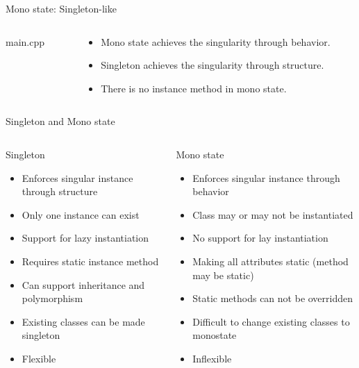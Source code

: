 \documentclass[13pt]{beamer}
\begin{document}
\begin{frame}{Mono state: Singleton-like}
\begin{columns}[T]
	\begin{column}{.45\textwidth}
		main.cpp
		\lstset{basicstyle=\tiny,style=myCustomCppStyle}
		
	\end{column}
	
	\begin{column}{.45\textwidth}
		\begin{itemize}
		\setlength\itemsep{1em}
		\item Mono state achieves the singularity through behavior.
		\item Singleton achieves the singularity through structure.
		\item There is no instance method in mono state.
\end{itemize}	
\end{column}
\end{columns}
\end{frame}

\begin{frame}{Singleton and Mono state}
\begin{columns}[T]
	\begin{column}{.45\textwidth}
		Singleton
		\begin{itemize}
			\item Enforces singular instance through structure
			\item Only one instance can exist
			\item Support for lazy instantiation
			\item Requires static instance method
			\item Can support inheritance and polymorphism
			\item Existing classes can be made singleton
			\item Flexible
		\end{itemize}	
	\end{column}
	
	\begin{column}{.45\textwidth}
		Mono state
		\begin{itemize}
			\item Enforces singular instance through behavior
			\item Class may or may not be instantiated
			\item No support for lay instantiation
			\item Making all attributes static (method may be static)
			\item Static methods can not be overridden
			\item Difficult to change existing classes to monostate
			\item Inflexible
		\end{itemize}	
	\end{column}
\end{columns}
\end{frame}
\end{document}
